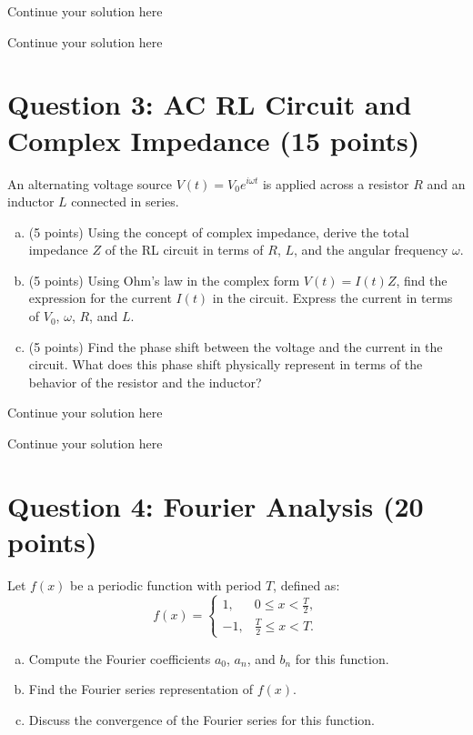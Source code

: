 \documentclass{article}
\begin{document}
\newpage
Continue your solution here
\vspace{4.0in}

\newpage

\newpage
Continue your solution here
\vspace{4.0in}

\newpage

\section*{Question 3: AC RL Circuit and Complex Impedance (15 points)}

An alternating voltage source \( V(t) = V_0 e^{i\omega t} \) is applied across a resistor \( R \) and an inductor \( L \) connected in series.

\begin{enumerate}[a)]
  \item (5 points) Using the concept of complex impedance, derive the total impedance \( Z \) of the RL circuit in terms of \( R \), \( L \), and the angular frequency \( \omega \).
  \item (5 points) Using Ohm's law in the complex form \( V(t) = I(t) Z \), find the expression for the current \( I(t) \) in the circuit. Express the current in terms of \( V_0 \), \( \omega \), \( R \), and \( L \).
  \item (5 points) Find the phase shift between the voltage and the current in the circuit. What does this phase shift physically represent in terms of the behavior of the resistor and the inductor?
\end{enumerate}

\newpage
Continue your solution here
\vspace{4.0in}

\newpage

\newpage
Continue your solution here
\vspace{4.0in}

\newpage

\section*{Question 4: Fourier Analysis (20 points)}

Let \( f(x) \) be a periodic function with period \( T \), defined as:
\[
f(x) = \begin{cases}
  1, & 0 \leq x < \frac{T}{2}, \\
  -1, & \frac{T}{2} \leq x < T.
\end{cases}
\]
\begin{enumerate}[a)]
  \item Compute the Fourier coefficients \( a_0 \), \( a_n \), and \( b_n \) for this function.
  \item Find the Fourier series representation of \( f(x) \).
  \item Discuss the convergence of the Fourier series for this function.
\end{enumerate}
\end{document}
